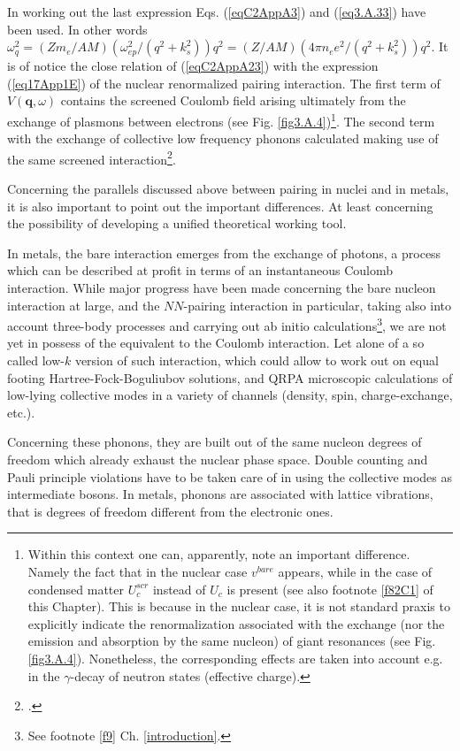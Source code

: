 In working out the last expression Eqs. (\ref{eqC2AppA3}) and (\ref{eq3.A.33}) have been used. In other words $\omega_q^2=(Zm_e/AM)(\omega^2_{ep}/(q^2+k_s^2))q^2=(Z/AM)(4\pi n_ee^2/(q^2+k_s^2))q^2$.
It is of notice the close relation of (\ref{eqC2AppA23}) with the expression (\ref{eq17App1E}) of the nuclear renormalized pairing interaction. The first term of $V(\mathbf q,\omega)$ contains the screened Coulomb field arising ultimately from the exchange of plasmons between electrons (see Fig. \ref{fig3.A.4})\footnote{Within this context one can, apparently, note an important difference. Namely the fact that in the nuclear case $v^{bare}$ appears, while in the case of condensed matter $U_c^{scr}$ instead of $U_c$ is present (see also footnote \ref{f82C1} of this Chapter). This is because in the nuclear case, it is not standard praxis to explicitly indicate the renormalization associated with the exchange (nor the emission and absorption by the same nucleon) of giant resonances (see Fig. \ref{fig3.A.4}). Nonetheless, the corresponding effects are taken into account e.g. in the $\gamma$-decay of neutron states (effective charge).}. The second term with the exchange of collective low frequency phonons calculated making use of the same screened interaction\footnote{\cite{Lindhard:53}.}.  


Concerning the parallels discussed above between pairing in nuclei and in metals, it is also important to point  out the important differences. At least concerning the possibility of developing a unified theoretical working tool. 

In metals, the bare interaction emerges from the exchange of photons, a process which can be described at profit in terms of an instantaneous Coulomb interaction. While major progress have been made concerning the bare nucleon interaction at large, and the $NN$-pairing interaction in particular, taking also into account three-body processes and carrying out ab initio calculations\footnote{See footnote \ref{f9} Ch. \ref{introduction}.}, we are not yet in possess of the equivalent to the Coulomb interaction.  Let alone of a so called low-$k$ version of such interaction, which could allow to work out on equal footing Hartree-Fock-Boguliubov solutions, and QRPA microscopic calculations of low-lying collective modes in a variety of channels (density, spin, charge-exchange, etc.).

Concerning these phonons, they are built out of the same nucleon degrees of freedom which already exhaust the nuclear phase space. Double counting and Pauli principle violations have to be taken care of in using the collective modes as intermediate bosons. In metals, phonons are associated with lattice vibrations, that is degrees of freedom different from the electronic ones.


